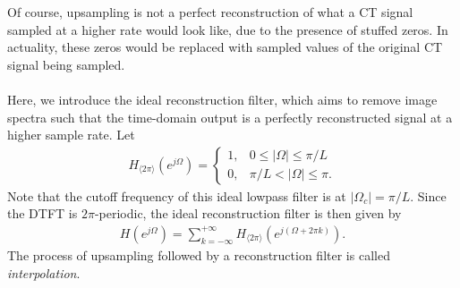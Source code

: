 \documentclass{report}
\begin{document}
Of course, upsampling is not a perfect reconstruction of what a CT signal sampled at a higher rate would look like, due to the presence of stuffed zeros. In actuality, these zeros would be replaced with 
sampled values of the original CT signal being sampled. 
\\ \\
Here, we introduce the ideal reconstruction filter, which aims to remove image spectra such that the time-domain output is a perfectly reconstructed signal at a higher sample rate. Let 
\begin{align}
    H_{\langle 2\pi\rangle}(e^{j\Omega}) = 
    \begin{cases}
        1, & 0\leq|\Omega|\leq\pi/L \\
        0, & \pi/L<|\Omega|\leq\pi.
    \end{cases}
\end{align}
Note that the cutoff frequency of this ideal lowpass filter is at $|\Omega_c|=\pi/L$. Since the DTFT is $2\pi$-periodic, the ideal reconstruction filter is then given by 
\begin{align}
    H(e^{j\Omega}) = \sum_{k=-\infty}^{+\infty} H_{\langle 2\pi\rangle}(e^{j(\Omega+2\pi k)}).
\end{align}
The process of upsampling followed by a reconstruction filter is called \emph{interpolation}.
\begin{center}
\end{center}
\end{document}
